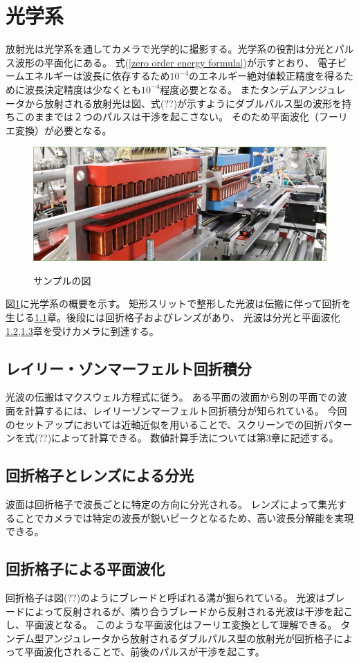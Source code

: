 \documentclass[a4paper,11pt,uplatex]{jsbook}
\begin{document}
\section{光学系}\label{sec:optics}
放射光は光学系を通してカメラで光学的に撮影する。光学系の役割は分光とパルス波形の平面化にある。
式(\ref{zero order energy formula})が示すとおり、
電子ビームエネルギーは波長に依存するため$10^{-4}$のエネルギー絶対値較正精度を得るために波長決定精度は少なくとも$10^{-4}$程度必要となる。
またタンデムアンジュレータから放射される放射光は図、式(??)が示すようにダブルパルス型の波形を持ちこのままでは２つのパルスは干渉を起こさない。
そのため平面波化（フーリエ変換）が必要となる。
\begin{figure}[tb]
  \centering
  \includegraphics[width=0.8\linewidth]{image/1-1.jpg}\\
  \caption{サンプルの図}
  \label{optics_schematic}
\end{figure}
図\ref{optics_schematic}に光学系の概要を示す。
矩形スリットで整形した光波は伝搬に伴って回折を生じる\ref{sec:rayleigh}章。後段には回折格子およびレンズがあり、
光波は分光と平面波化\ref{sec:grating},\ref{sec:grating2}章を受けカメラに到達する。
\subsection{レイリー・ゾンマーフェルト回折積分}\label{sec:rayleigh}
光波の伝搬はマクスウェル方程式に従う。
ある平面の波面から別の平面での波面を計算するには、レイリーゾンマーフェルト回折積分が知られている。
今回のセットアップにおいては近軸近似を用いることで、スクリーンでの回折パターンを式(??)によって計算できる。
数値計算手法については第3章に記述する。
\subsection{回折格子とレンズによる分光}\label{sec:grating}
波面は回折格子で波長ごとに特定の方向に分光される。
レンズによって集光することでカメラでは特定の波長が鋭いピークとなるため、高い波長分解能を実現できる。
\subsection{回折格子による平面波化}\label{sec:grating2}
回折格子は図(??)のようにブレードと呼ばれる溝が掘られている。
光波はブレードによって反射されるが、隣り合うブレードから反射される光波は干渉を起こし、平面波となる。
このような平面波化はフーリエ変換として理解できる。
タンデム型アンジュレータから放射されるダブルパルス型の放射光が回折格子によって平面波化されることで、前後のパルスが干渉を起こす。
\end{document}
